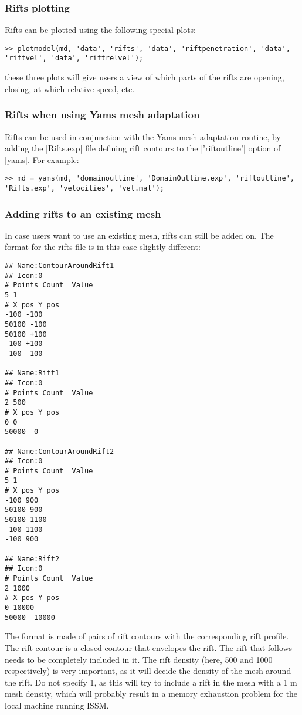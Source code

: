 \subsubsection{Rifts plotting}
Rifts can be plotted using the following special plots:
\begin{lstlisting}
>> plotmodel(md, 'data', 'rifts', 'data', 'riftpenetration', 'data', 'riftvel', 'data', 'riftrelvel');
\end{lstlisting}
these three plots will give users a view of which parts of the rifts are opening, closing, at which relative speed, etc.

\subsubsection{Rifts when using Yams mesh adaptation}
Rifts can be used in conjunction with the Yams mesh adaptation routine, by adding the \lstinlinebg|Rifts.exp| file defining rift contours to the \lstinlinebg|'riftoutline'| option of \lstinlinebg|yams|. For example:
\begin{lstlisting}
>> md = yams(md, 'domainoutline', 'DomainOutline.exp', 'riftoutline', 'Rifts.exp', 'velocities', 'vel.mat');
\end{lstlisting}

\subsubsection{Adding rifts to an existing mesh}
In case users want to use an existing mesh, rifts can still be added on. The format for the rifts file is in this case slightly different:
\begin{lstlisting}
## Name:ContourAroundRift1
## Icon:0
# Points Count  Value
5 1
# X pos Y pos
-100 -100
50100 -100
50100 +100
-100 +100
-100 -100

## Name:Rift1
## Icon:0
# Points Count  Value
2 500
# X pos Y pos
0 0
50000  0

## Name:ContourAroundRift2
## Icon:0
# Points Count  Value
5 1
# X pos Y pos
-100 900
50100 900
50100 1100
-100 1100
-100 900

## Name:Rift2
## Icon:0
# Points Count  Value
2 1000
# X pos Y pos
0 10000
50000  10000
\end{lstlisting}

The format is made of pairs of rift contours with the corresponding rift profile. The rift contour is a closed contour that envelopes the rift. The rift that follows needs to be completely included in it. The rift density (here, 500 and 1000 respectively) is very important, as it will decide the density of the mesh around the rift. Do not specify 1, as this will try to include a rift in the mesh with a 1 m mesh density, which will probably result in a memory exhaustion problem for the local machine running ISSM.

\clearpage %
